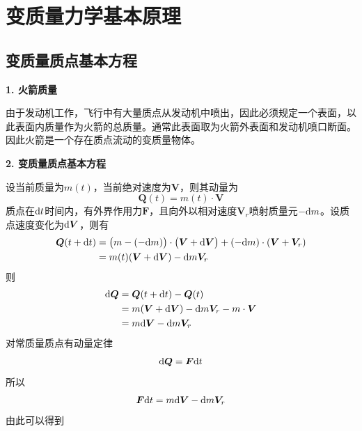 \section{变质量力学基本原理}
\subsection{变质量质点基本方程}
	\textbf{1. 火箭质量}
	
	由于发动机工作，飞行中有大量质点从发动机中喷出，因此必须规定一个表面，以此表面内质量作为火箭的总质量。通常此表面取为火箭外表面和发动机喷口断面。因此火箭是一个存在质点流动的变质量物体。
	
	\vspace*{1em}
	\textbf{2. 变质量质点基本方程}
	
	设当前质量为$m(t)$，当前绝对速度为$\bm{V}$，则其动量为
	\begin{equation}
		\bm{Q}(t) = m(t) \cdot \bm{V}
	\end{equation}
	质点在${\rm{d}} t$时间内，有外界作用力$\bm{F}$，且向外以相对速度$\bm{V}_r$喷射质量元$-{\rm{d}} m$。设质点速度变化为${\rm{d}} \bm{V}$，则有
	\begin{equation}
		\begin{split}
			\bm{Q}(t+{\rm{d}} t) &= \big(m - (-{\rm{d}} m)\big)\cdot \big(\bm{V} + {\rm{d}} \bm{V}\big)+(-{\rm{d}} m) \cdot (\bm{V} + \bm{V}_r)\\
			& = m(t)(\bm{V} + {\rm{d}} \bm{V}) - {\rm{d}} m \bm{V}_r
		\end{split}
	\end{equation}
	则
	\begin{equation}
		\begin{split}
			{\rm{d}} \bm{Q} &= \bm{Q}(t + {\rm{d}} t) - \bm{Q}(t) \\
			&= m(\bm{V} + {\rm{d}} \bm{V}) - {\rm{d}} m \bm{V}_r - m \cdot \bm{V} \\
			& = m {\rm{d}} \bm{V} -{\rm{d}} m \bm{V}_r
		\end{split}
	\end{equation}
	对常质量质点有动量定律
	\begin{equation}
		{\rm{d}} \bm{Q} = \bm{F} {\rm{d}} t
	\end{equation}
	所以
	\begin{equation}
		\bm{F} {\rm{d}} t = m {\rm{d}} \bm{V} -{\rm{d}} m \bm{V}_r
	\end{equation}
	由此可以得到
	
